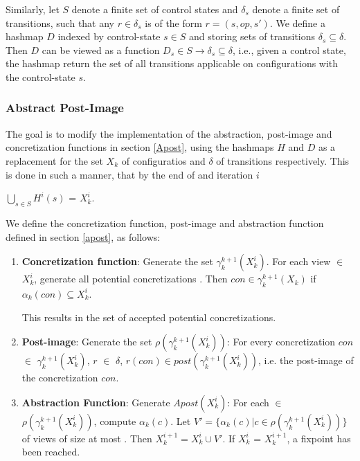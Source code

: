 Similarly, let $S$ denote a finite set of control states and $\delta_s$ denote a finite set of transitions, such that any $r \in \delta_s$ is of the form $r = (s, op, s')$. We define a hashmap $D$ indexed by control-state $s \in S$ and storing sets of transitions $\delta_s \subseteq \delta$. Then $D$ can be viewed as a function $D_ s \in S \rightarrow \delta_s \subseteq \delta$, i.e., given a control state, the hashmap return the set of all transitions applicable on configurations with the control-state $s$.

\subsubsection{Abstract Post-Image}
The goal is to modify the implementation of the abstraction, post-image and concretization functions in section \ref{Apost}, using the hashmaps $H$ and $D$ as a replacement for the set $X_k$ of configuratios and $\delta$ of transitions respectively. This is done in such a manner, that by the end of and iteration $i$

$\bigcup\limits_{s \in S} H^i(s)$ = $X_k^i$.

We define the concretization function, post-image and abstraction function defined in section \ref{apost}, as follows:

\begin{enumerate}
\item
\textbf{Concretization function}:
Generate the set $\gamma_k^{k+1}(X_k^i)$. For each view  $\in$ $X_k^i$, generate all potential concretizations . Then $con \in \gamma_k^{k+1}(X_k)$ if $\alpha_k(con) \subseteq X_k^i$.

This results in the set of accepted potential concretizations.

\item
\textbf{Post-image}:
Generate the set $\rho(\gamma_k^{k+1}(X_k^i))$: For every concretization $con$ $\in$ $\gamma_k^{k+1}(X_k^i)$, $r$ $\in$ $\delta$, $r(con) \in post(\gamma_k^{k+1}(X_k^i))$, i.e. the post-image of the concretization $con$.

\item
\textbf{Abstraction Function}:
Generate $Apost(X_k^i)$: For each  $\in$ $\rho(\gamma_k^{k+1}(X_k^i))$, compute $\alpha_k(c)$. Let $V' = \{\alpha_k(c)|c \in \rho(\gamma_k^{k+1}(X_k^i))\}$ of views of size at most . Then $X_k^{i+1} = X_k^i \cup V'$. If $X_k^i$ = $X_k^{i+1}$, a fixpoint has been reached.
\end{enumerate}

